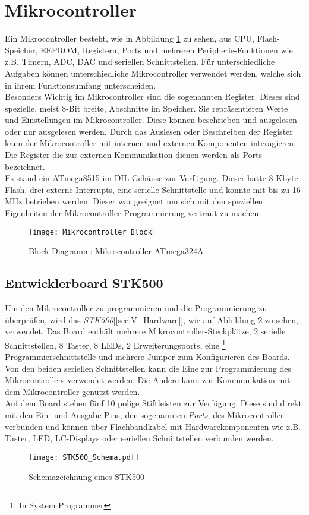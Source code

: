 \section{Mikrocontroller}
\label{sec:Mikrocontroller}
Ein Mikrocontroller besteht, wie in Abbildung \ref{fig:uC_Blockdiagramm} zu sehen, aus CPU, Flash-Speicher, EEPROM, Registern, Ports und mehreren Peripherie-Funktionen wie z.B. Timern, ADC, DAC und seriellen Schnittstellen. Für unterschiedliche Aufgaben können unterschiedliche Mikrocontroller verwendet werden, welche sich in ihrem Funktionsumfang unterscheiden.\\
Besonders Wichtig im Mikrocontroller sind die sogenannten Register. Dieses sind spezielle, meist 8-Bit breite, Abschnitte im Speicher. Sie repräsentieren Werte und Einstellungen im Mikrocontroller. Diese können  beschrieben und ausgelesen oder nur ausgelesen werden. Durch das Auslesen oder Beschreiben der Register kann der Mikrocontroller mit internen und externen Komponenten interagieren. Die Register die zur externen Kommunikation dienen werden als Ports bezeichnet. \\
Es stand ein ATmega8515 \cite{atmel:8515} im DIL-Gehäuse zur Verfügung. Dieser hatte 8 Kbyte Flash, drei externe Interrupts, eine serielle Schnittstelle und konnte mit bis zu 16 MHz betrieben werden. 
Dieser war geeignet um sich mit den speziellen Eigenheiten der Mikrocontroller Programmierung vertraut zu machen.
\begin{figure}[htb]
\centering
\texttt{[image: Mikrocontroller\_Block]}
\caption{Block Diagramm: Mikrocontroller ATmega324A\cite{atmel:ug_324A}}
\label{fig:uC_Blockdiagramm}
\end{figure}

\subsection{Entwicklerboard STK500}
\label{sec:STK500}
Um den Mikrocontroller zu programmieren und die Programmierung zu überprüfen, wird das  \emph{STK500}[\ref{sec:V_Hardware}], wie auf Abbildung \ref{fig:STK500} zu sehen, verwendet. Das Board enthält mehrere Mikrocontroller-Steckplätze, 2 serielle Schnittstellen, 8 Taster, 8 LEDs, 2 Erweiterungsports, eine \footnote{In System Programmer} Programmierschnittstelle und mehrere Jumper zum Konfigurieren des Boards.\\
Von den beiden seriellen Schnittstellen kann die Eine zur Programmierung des Mikrocontrollers verwendet werden. Die Andere kann zur Kommunikation mit dem Mikrocontroller genutzt werden.\\
Auf dem Board stehen fünf 10 polige Stiftleisten 
zur Verfügung. Diese sind direkt mit den Ein- und Ausgabe Pins, den sogenannten \emph{Ports}, des Mikrocontroller verbunden und können über Flachbandkabel mit Hardwarekomponenten wie z.B. Taster, LED, LC-Displays oder seriellen Schnittstellen verbunden werden.
\begin{figure}[htb]
\centering
\texttt{[image: STK500\_Schema.pdf]}
\caption{Schemazeichnung eines STK500\cite{atmel:ug_STK500}}
\label{fig:STK500}
\end{figure}

